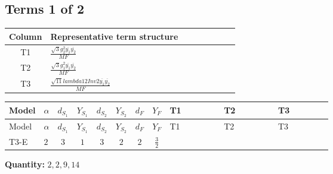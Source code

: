 \documentclass[8pt]{article}
\begin{document}
\begin{landscape}
\subsection*{Terms 1 of 2}
\begin{center}
\begin{tabular}{@{}c >{\raggedright\arraybackslash}p{0.82\linewidth}@{}}
\toprule
Column & Representative term structure \\
\midrule
T1 & \(\displaystyle \frac{\sqrt{3} g_{2}^{2} \overline{y_{1}} \overline{y_{2}}}{MF}\) \\
\midrule
T2 & \(\displaystyle \frac{\sqrt{3} g_{1}^{2} \overline{y_{1}} \overline{y_{2}}}{MF}\) \\
\midrule
T3 & \(\displaystyle \frac{\sqrt{11} lambda12Inv2 \overline{y_{1}} \overline{y_{2}}}{MF}\) \\
\midrule
\bottomrule
\end{tabular}
\end{center}
\smallskip
\tiny
\begin{longtable}{@{}llcccccc >{\raggedright\arraybackslash}p{0.21\linewidth} >{\raggedright\arraybackslash}p{0.21\linewidth} >{\raggedright\arraybackslash}p{0.21\linewidth}@{}}
\toprule
Model & $\alpha$ & $d_{S_1}$ & $Y_{S_1}$ & $d_{S_2}$ & $Y_{S_2}$ & $d_F$ & $Y_F$ & T1 & T2 & T3 \\
\midrule
\endfirsthead
\toprule
Model & $\alpha$ & $d_{S_1}$ & $Y_{S_1}$ & $d_{S_2}$ & $Y_{S_2}$ & $d_F$ & $Y_F$ & T1 & T2 & T3 \\
\midrule
\endhead
T3-E & $2$ & $3$ & $1$ & $3$ & $2$ & $2$ & $\frac{3}{2}$ & \scriptsize\adjustbox{max width=\linewidth}{$\begin{gathered} - \frac{11 \sqrt{3} g_{2}^{2} \overline{y_{1}} \overline{y_{2}}}{8 MF}\end{gathered}$} & \scriptsize\adjustbox{max width=\linewidth}{$\begin{gathered} - \frac{9 \sqrt{3} g_{1}^{2} \overline{y_{1}} \overline{y_{2}}}{8 MF}\end{gathered}$} & \scriptsize\adjustbox{max width=\linewidth}{$\begin{gathered} - \frac{3 \sqrt{11} lambda12Inv2 \overline{y_{1}} \overline{y_{2}}}{22 MF}\end{gathered}$} \\
\midrule
\bottomrule
\end{longtable}
\clearpage
\noindent\textbf{Quantity: }$\mathrm{2,2,9,14}$\par\smallskip

\end{landscape}
\end{document}
